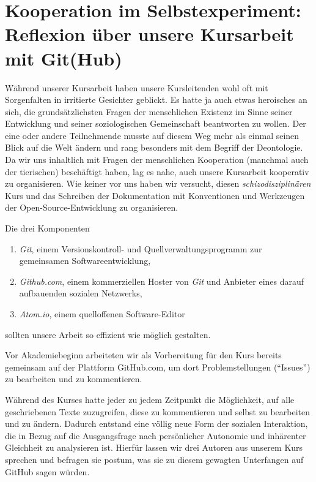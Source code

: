 \section[Kursreflexion]{Kooperation im Selbstexperiment: Reflexion über unsere Kursarbeit mit Git(Hub)}

Während unserer Kursarbeit haben unsere Kursleitenden wohl oft mit Sorgenfalten in irritierte Gesichter geblickt.
Es hatte ja auch etwas heroisches an sich, die grundsätzlichsten Fragen der menschlichen Existenz im Sinne seiner Entwicklung und seiner soziologischen Gemeinschaft beantworten zu wollen.
Der eine oder andere Teilnehmende musste auf diesem Weg mehr als einmal seinen Blick auf die Welt ändern und rang besonders mit dem Begriff der Deontologie.
Da wir uns inhaltlich mit Fragen der menschlichen Kooperation (manchmal auch der tierischen) beschäftigt haben, lag es nahe, auch unsere Kursarbeit kooperativ zu organisieren.
Wie keiner vor uns haben wir versucht, diesen \emph{schizodisziplinären} Kurs und das Schreiben der Dokumentation mit Konventionen und Werkzeugen der Open-Source-Entwicklung zu organisieren.

Die drei Komponenten

\begin{enumerate}
	\item \emph{Git}, einem Versionskontroll- und Quellverwaltungsprogramm zur gemeinsamen Softwareentwicklung,
	\item \emph{Github.com}, einem kommerziellen Hoster von \emph{Git} und Anbieter eines darauf aufbauenden sozialen Netzwerks,
	\item \emph{Atom.io}, einem quelloffenen Software-Editor
\end{enumerate}

sollten unsere Arbeit so effizient wie möglich gestalten.

Vor Akademiebeginn arbeiteten wir als Vorbereitung für den Kurs bereits gemeinsam auf der Plattform GitHub.com, um dort Problemstellungen (``Issues'') zu bearbeiten und zu kommentieren.

Während des Kurses hatte jeder zu jedem Zeitpunkt die Möglichkeit, auf alle geschriebenen Texte zuzugreifen, diese zu kommentieren und selbst zu bearbeiten und zu ändern.
Dadurch entstand eine völlig neue Form der sozialen Interaktion, die in Bezug auf die Ausgangsfrage nach persönlicher Autonomie und inhärenter Gleichheit zu analysieren ist.
Hierfür lassen wir drei Autoren aus unserem Kurs sprechen und befragen sie postum, was sie zu diesem gewagten Unterfangen auf GitHub sagen würden.


